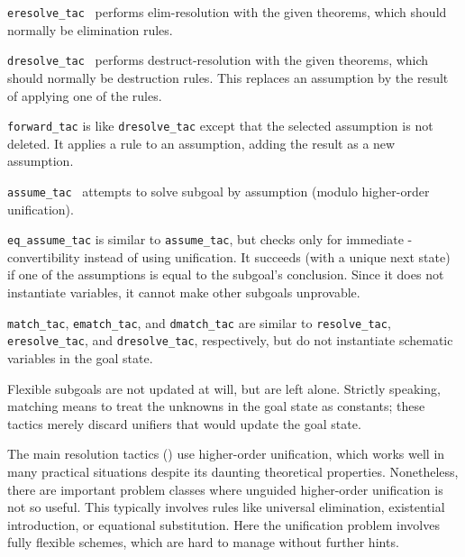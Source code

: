 \begin{isabellebody}
\begin{isamarkuptext}
\begin{description}
  \item \verb|eresolve_tac|~ performs elim-resolution
  with the given theorems, which should normally be elimination rules.

  \item \verb|dresolve_tac|~ performs
  destruct-resolution with the given theorems, which should normally
  be destruction rules.  This replaces an assumption by the result of
  applying one of the rules.

  \item \verb|forward_tac| is like \verb|dresolve_tac| except that the
  selected assumption is not deleted.  It applies a rule to an
  assumption, adding the result as a new assumption.

  \item \verb|assume_tac|~ attempts to solve subgoal 
  by assumption (modulo higher-order unification).

  \item \verb|eq_assume_tac| is similar to \verb|assume_tac|, but checks
  only for immediate -convertibility instead of using
  unification.  It succeeds (with a unique next state) if one of the
  assumptions is equal to the subgoal's conclusion.  Since it does not
  instantiate variables, it cannot make other subgoals unprovable.

  \item \verb|match_tac|, \verb|ematch_tac|, and \verb|dmatch_tac| are
  similar to \verb|resolve_tac|, \verb|eresolve_tac|, and \verb|dresolve_tac|, respectively, but do not instantiate schematic
  variables in the goal state.

  Flexible subgoals are not updated at will, but are left alone.
  Strictly speaking, matching means to treat the unknowns in the goal
  state as constants; these tactics merely discard unifiers that would
  update the goal state.

  \end{description}%
\end{isamarkuptext}%
\isamarkuptrue%
%
\endisatagmlref
{\isafoldmlref}%
%
\isadelimmlref
%
\endisadelimmlref
%
\isamarkuptrue%
%
\begin{isamarkuptext}%
The main resolution tactics ()
  use higher-order unification, which works well in many practical
  situations despite its daunting theoretical properties.
  Nonetheless, there are important problem classes where unguided
  higher-order unification is not so useful.  This typically involves
  rules like universal elimination, existential introduction, or
  equational substitution.  Here the unification problem involves
  fully flexible  schemes, which are hard to manage
  without further hints.


\end{isamarkuptext}
\end{isabellebody}
